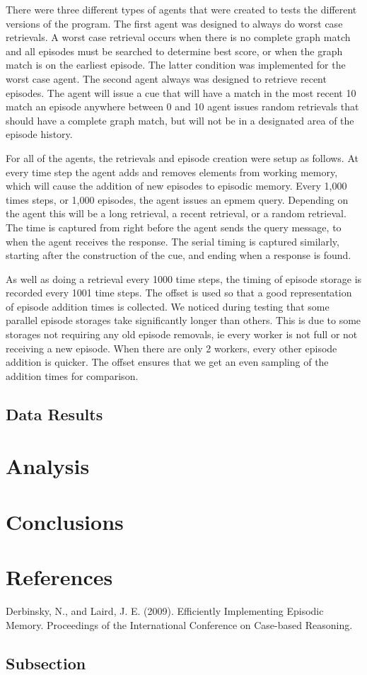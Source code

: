 \documentclass[11pt]{article} %
\begin{document}
There were three different types of agents that were created to tests the
different versions of the program. The first agent was designed to always do
worst case retrievals. A worst case retrieval occurs when there is no complete
graph match and all episodes must be searched to determine best score, or when
the graph match is on the earliest episode. The latter condition was implemented
for the worst case agent. The second agent always was designed to retrieve
recent episodes. The agent will issue a cue that will have a match in the most
recent 10%
match an episode anywhere between 0 and 10%
agent issues random retrievals that should have a complete graph match, but will
not be in a designated area of the episode history.

For all of the agents, the retrievals and episode creation were setup as
follows. At every time step the agent adds and removes elements from working
memory, which will cause the addition of new episodes to episodic memory. Every
1,000 times steps, or 1,000 episodes, the agent issues an epmem query. Depending
on the agent this will be a long retrieval, a recent retrieval, or a random
retrieval. The time is captured from right before the agent sends the query
message, to when the agent receives the response. The serial timing is captured
similarly, starting after the construction of the cue, and ending when a
response is found.

As well as doing a retrieval every 1000 time steps, the timing of episode
storage is recorded every 1001 time steps. The offset is used so that a good
representation of episode addition times is collected. We noticed during testing
that some parallel episode storages take significantly longer than others. This
is due to some storages not requiring any old episode removals, ie every worker
is not full or not receiving a new episode. When there are only 2 workers, every
other episode addition is quicker. The offset ensures that we get an even
sampling of the addition times for comparison.


\subsection{Data Results}

\section{Analysis}

\section{Conclusions}

\section{References}

Derbinsky, N., and Laird, J. E. (2009). Efficiently Implementing Episodic
Memory. Proceedings of the International Conference on Case-based Reasoning.


\subsection {Subsection}
\end{document}
